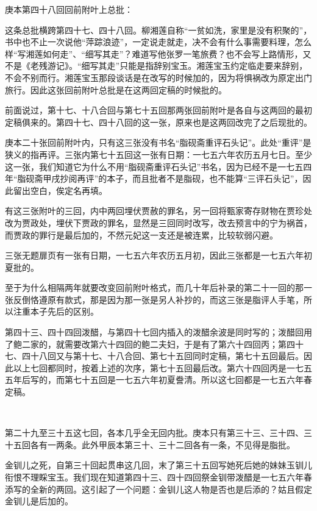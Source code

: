\par 庚本第四十八回回前附叶上总批：
\par 这条总批横跨第四十七、四十八回。柳湘莲自称“一贫如洗，家里是没有积聚的”，书中也不止一次说他“萍踪浪迹”，一定说走就走，决不会有什么事需要料理，怎么样“写湘莲如何走”、“细写其走”？难道写他张罗一笔旅费？也不会写上路情形，又不是《老残游记》。“细写其走”只能是指辞别宝玉。湘莲宝玉约定临走要来辞别，不会不别而行。湘莲宝玉那段谈话是在改写的时候加的，因为将惧祸改为原定出门旅行。因此这张回前附叶总批是在这两回定稿的时候批的。
\par 前面说过，第十七、十八合回与第七十五回那两张回前附叶是各自与这两回的最初定稿俱来的。第四十七、四十八回的这一张，原来也是这两回改完了之后现批的。
\par 庚本二十张回前附叶内，只有这三张没有书名“脂砚斋重评石头记”。此处“重评”是狭义的指再评。三张内第七十五回这一张有日期：一七五六年农历五月七日。至少这一张，我们知道它为什么不用“脂砚斋重评石头记”书名，因为已经不是一七五四年“脂砚斋甲戌抄阅再评”的本子，而且批者不是脂砚，也不能算“三评石头记”，因此留出空白，俟定名再填。
\par 有这三张附叶的三回，内中两回埋伏贾赦的罪名，另一回将甄家寄存财物在贾珍处改为贾政处，埋伏下贾政的罪名，显然是三回同时改写，改去预言中的宁为祸首，而贾政的罪行是最后加的，不然元妃这一支还是被连累，比较软弱闪避。
\par 三张无题扉页有一张有日期，一七五六年农历五月初，因此三张都是一七五六年初夏批的。
\par 至于为什么相隔两年就要改变回前附叶格式，而几十年后补录的第二十一回的那一张反倒恪遵原有款式，那是因为那一张是另人补抄的，而这三张是脂评人手笔，所以注重本子先后的区别。
\par 第四十三、四十四回泼醋，与第四十七回内插入的泼醋余波是同时写的；泼醋回用了鲍二家的，就需要改第六十四回的鲍二夫妇，于是有了第六十四回丙；第四十七、四十八回又与第十七、十八合回、第七十五回同时定稿，第七十五回最后。因此以上七回都同时，按着上述的次序，第七十五回最后改。第六十四回丙是一七五五年后写的，而第七十五回是一七五六年初夏誊清。所以这七回都是一七五六年春定稿。
\par  
\par 第二十九至三十五这七回，各本几乎全无回内批。庚本只有第三十三、三十四、三十五回各有一两条。此外甲辰本第三十、三十二回各有一条，不见得是脂批。
\par 金钏儿之死，自第三十回起贯串这几回，末了第三十五回写她死后她的妹妹玉钏儿衔恨不理睬宝玉。我们现在知道第四十三、四十四回祭金钏带泼醋是一七五六年春添写的全新的两回。这引起了一个问题：金钏儿这人物是否也是后添的？姑且假定金钏儿是后加的。
